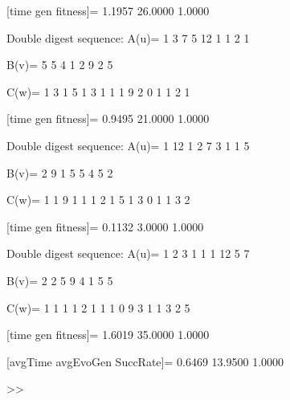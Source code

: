 [time gen fitness]=
    1.1957   26.0000    1.0000

Double digest sequence:
A(u)=
     1     3     7     5    12     1     1     2     1

B(v)=
     5     5     4     1     2     9     2     5

C(w)=
     1     3     1     5     1     3     1     1     1     9     2     0     1     1     2     1

[time gen fitness]=
    0.9495   21.0000    1.0000

Double digest sequence:
A(u)=
     1    12     1     2     7     3     1     1     5

B(v)=
     2     9     1     5     5     4     5     2

C(w)=
     1     1     9     1     1     1     2     1     5     1     3     0     1     1     3     2

[time gen fitness]=
    0.1132    3.0000    1.0000

Double digest sequence:
A(u)=
     1     2     3     1     1     1    12     5     7

B(v)=
     2     2     5     9     4     1     5     5

C(w)=
     1     1     1     1     2     1     1     1     0     9     3     1     1     3     2     5

[time gen fitness]=
    1.6019   35.0000    1.0000

[avgTime  avgEvoGen  SuccRate]=
    0.6469   13.9500    1.0000

>> 